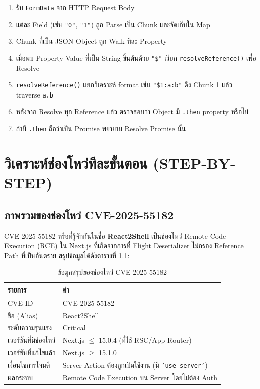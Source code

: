 \documentclass[12pt,oneside]{report}
\begin{document}
\begin{enumerate}
    \item รับ \texttt{FormData} จาก HTTP Request Body
    \item แต่ละ Field (เช่น \texttt{"0"}, \texttt{"1"}) ถูก Parse เป็น Chunk และจัดเก็บใน Map
    \item Chunk ที่เป็น JSON Object ถูก Walk ทีละ Property
    \item เมื่อพบ Property Value ที่เป็น String ขึ้นต้นด้วย \texttt{"\$"} เรียก \texttt{resolveReference()} เพื่อ Resolve
    \item \texttt{resolveReference()} แยกวิเคราะห์ format เช่น \texttt{"\$1:a:b"} ดึง Chunk 1 แล้ว traverse \texttt{a.b}
    \item หลังจาก Resolve ทุก Reference แล้ว ตรวจสอบว่า Object มี \texttt{.then} property หรือไม่
    \item ถ้ามี \texttt{.then} ถือว่าเป็น Promise พยายาม Resolve Promise นั้น
\end{enumerate}

\chapter{วิเคราะห์ช่องโหว่ทีละขั้นตอน (STEP-BY-STEP)}

\section{ภาพรวมของช่องโหว่ CVE-2025-55182}

CVE-2025-55182 หรือที่รู้จักกันในชื่อ \textbf{React2Shell} เป็นช่องโหว่ Remote Code Execution (RCE) ใน Next.js ที่เกิดจากการที่ Flight Deserializer ไม่กรอง Reference Path ที่เป็นอันตราย สรุปข้อมูลได้ดังตารางที่ \ref{tab:cve_info}:

\begin{table}[ht]
    \centering
    \caption{ข้อมูลสรุปของช่องโหว่ CVE-2025-55182}
    \vspace{0.3cm}
    \begin{tabular}{ll}
        \toprule
        \textbf{รายการ} & \textbf{ค่า} \\
        \midrule
        CVE ID & CVE-2025-55182 \\
        ชื่อ (Alias) & React2Shell \\
        ระดับความรุนแรง & Critical \\
        เวอร์ชันที่มีช่องโหว่ & Next.js $\leq$ 15.0.4 (ที่ใช้ RSC/App Router) \\
        เวอร์ชันที่แก้ไขแล้ว & Next.js $\geq$ 15.1.0 \\
        เงื่อนไขการโจมตี & Server Action ต้องถูกเปิดใช้งาน (มี \texttt{'use server'}) \\
        ผลกระทบ & Remote Code Execution บน Server โดยไม่ต้อง Auth \\
        \bottomrule
    \end{tabular}
    \label{tab:cve_info}
\end{table}
\end{document}
